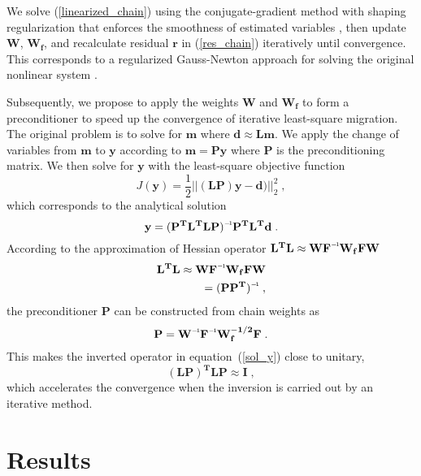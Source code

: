 We solve (\ref{linearized_chain}) using the conjugate-gradient method with shaping regularization that enforces the smoothness of estimated variables \cite[]{shaping}, then update $\mathbf{W}$, $\mathbf{W_f}$, and recalculate residual $\mathbf{r}$ in (\ref{res_chain}) iteratively until  convergence. This corresponds to a regularized Gauss-Newton approach for solving the original nonlinear system \cite[]{ls}.

Subsequently, we propose to apply the weights $\mathbf{W}$ and $\mathbf{W_{f}}$ to form a preconditioner to speed up the convergence of iterative least-square migration. The original problem is to solve for $\mathbf{m}$ where $\mathbf{d \approx Lm}$. We apply the change of variables from $\mathbf{m}$ to $\mathbf{y}$ according to $\mathbf{m} = \mathbf{Py}$ where $\mathbf{P}$ is the preconditioning matrix. We then solve for $\mathbf{y}$ with the least-square objective function 
\begin{equation}
     J(\mathbf{y}) = \frac{1}{2} || \mathbf{(LP)y - d) }||_2 ^2\;,
\end{equation}
which corresponds to the analytical solution
\begin{equation}
    \mathbf{y = \inv{(P^{T}L^{T}LP)}P^{T}L^{T}d}\;.
\label{sol_y}
\end{equation}
According to the approximation of Hessian operator $\mathbf{L^{T}L \approx W\inv{F}W_{f}FW}$
\begin{equation} \label{precondition}
\begin{split}
    \mathbf{L^{T}L \approx W\inv{F}W_{f}FW} \\
            \mathbf{=  \inv{(PP^{T})}}\;,
\end{split}
\end{equation}
the preconditioner $\mathbf{P}$ can be constructed from chain weights as
\begin{equation}
    \mathbf{P = \inv{W}\inv{F}W_{f}^{-1/2}F}\;.
\label{prec}
\end{equation}
This makes the inverted operator in equation~(\ref{sol_y}) close to unitary,
\begin{equation}
    \mathbf{(LP)^{T}LP \approx I}\;,
\end{equation}
which accelerates the convergence when the inversion is carried out by an iterative method.

\section{Results}


